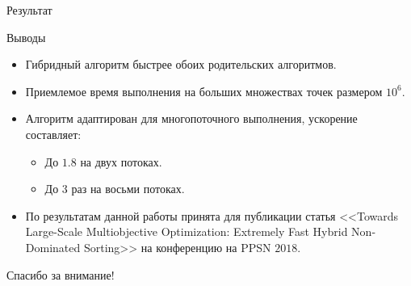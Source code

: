 \documentclass[table]{beamer}
\begin{document}
\begin{frame}{Результат}
\begin{block}{Выводы}
\begin{itemize}
\item Гибридный алгоритм быстрее обоих родительских алгоритмов.
\item Приемлемое время выполнения на больших множествах точек размером $10^6$.
\item Алгоритм адаптирован для многопоточного выполнения, ускорение составляет:
\begin{itemize}
  \item До $1.8$ на двух потоках.
  \item До $3$ раз на восьми потоках.
\end{itemize}
\item По результатам данной работы принята для публикации статья <<Towards Large-Scale Multiobjective Optimization: Extremely Fast Hybrid Non-Dominated Sorting>> на конференцию на PPSN $2018$. 
\end{itemize}
\end{block}
\end{frame}


\begin{frame}{}
\begin{center}
Спасибо за внимание!
\end{center}
\end{frame}

\appendix

\end{document}
